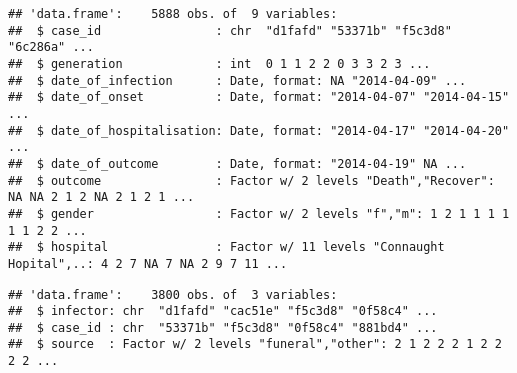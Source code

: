 \documentclass[9pt,a4paper,]{extarticle}
\newenvironment{Shaded}{\begin{snugshade}}{\end{snugshade}}
\newcommand{\KeywordTok}[1]{\textcolor[rgb]{0.13,0.29,0.53}{\textbf{#1}}}
\newcommand{\DecValTok}[1]{\textcolor[rgb]{0.00,0.00,0.81}{#1}}
\newcommand{\CommentTok}[1]{\textcolor[rgb]{0.56,0.35,0.01}{\textit{#1}}}
\newcommand{\OperatorTok}[1]{\textcolor[rgb]{0.81,0.36,0.00}{\textbf{#1}}}
\newcommand{\NormalTok}[1]{#1}
\theoremstyle{definition}
\theoremstyle{definition}
\theoremstyle{definition}
\theoremstyle{remark}
\begin{document}
\begin{Shaded}
\end{Shaded}

\begin{verbatim}
## 'data.frame':    5888 obs. of  9 variables:
##  $ case_id                : chr  "d1fafd" "53371b" "f5c3d8" "6c286a" ...
##  $ generation             : int  0 1 1 2 2 0 3 3 2 3 ...
##  $ date_of_infection      : Date, format: NA "2014-04-09" ...
##  $ date_of_onset          : Date, format: "2014-04-07" "2014-04-15" ...
##  $ date_of_hospitalisation: Date, format: "2014-04-17" "2014-04-20" ...
##  $ date_of_outcome        : Date, format: "2014-04-19" NA ...
##  $ outcome                : Factor w/ 2 levels "Death","Recover": NA NA 2 1 2 NA 2 1 2 1 ...
##  $ gender                 : Factor w/ 2 levels "f","m": 1 2 1 1 1 1 1 1 2 2 ...
##  $ hospital               : Factor w/ 11 levels "Connaught Hopital",..: 4 2 7 NA 7 NA 2 9 7 11 ...
\end{verbatim}

\begin{Shaded}
\end{Shaded}

\begin{verbatim}
## 'data.frame':    3800 obs. of  3 variables:
##  $ infector: chr  "d1fafd" "cac51e" "f5c3d8" "0f58c4" ...
##  $ case_id : chr  "53371b" "f5c3d8" "0f58c4" "881bd4" ...
##  $ source  : Factor w/ 2 levels "funeral","other": 2 1 2 2 2 1 2 2 2 2 ...
\end{verbatim}

\begin{Shaded}
\end{Shaded}
\end{document}
